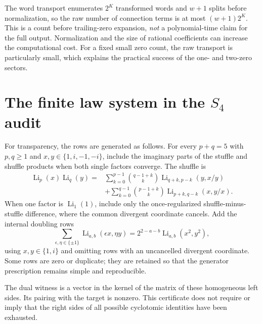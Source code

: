 \documentclass[11pt]{article}
\numberwithin{equation}{section}
\theoremstyle{definition}\newtheorem{definition}[theorem]{Definition}
\theoremstyle{remark}\newtheorem{remark}[theorem]{Remark}
\DeclareMathOperator{\Li}{Li}
\begin{document}
The word transport enumerates $2^K$ transformed words and $w+1$ splits
before normalization, so the raw number of connection terms is at most
$(w+1)2^K$. This is a count before trailing-zero expansion, \emph{not}
a polynomial-time claim for the full output. Normalization and the size
of rational coefficients can increase the computational cost. For a
fixed small zero count, the raw transport is particularly small, which
explains the practical success of the one- and two-zero sectors.

\section{The finite law system in the \texorpdfstring{$S_4$}{S4} audit}
For transparency, the rows are generated as follows. For every
$p+q=5$ with $p,q\ge1$ and $x,y\in\{1,i,-1,-i\}$, include the
imaginary parts of the stuffle and shuffle products when both single
factors converge. The shuffle is
\begin{align*}
\Li_p(x)\Li_q(y)
={}&\sum_{k=0}^{p-1}\binom{q-1+k}{k}
 \Li_{q+k,p-k}(y,x/y)\\
&+\sum_{k=0}^{q-1}\binom{p-1+k}{k}
 \Li_{p+k,q-k}(x,y/x).
\end{align*}
When one factor is $\Li_1(1)$, include only the once-regularized
shuffle-minus-stuffle difference, where the common divergent coordinate
cancels. Add the internal doubling rows
\[
 \sum_{\epsilon,\eta\in\{\pm1\}}
 \Li_{a,b}(\epsilon x,\eta y)
 =2^{2-a-b}\Li_{a,b}(x^2,y^2),
\]
using $x,y\in\{1,i\}$ and omitting rows with an uncancelled divergent
coordinate. Some rows are zero or duplicate; they are retained so that
the generator prescription remains simple and reproducible.

The dual witness is a vector in the kernel of the matrix of these
homogeneous left sides. Its pairing with the target is nonzero.
This certificate does not require or imply that the right sides of all
possible cyclotomic identities have been exhausted.
\end{document}
